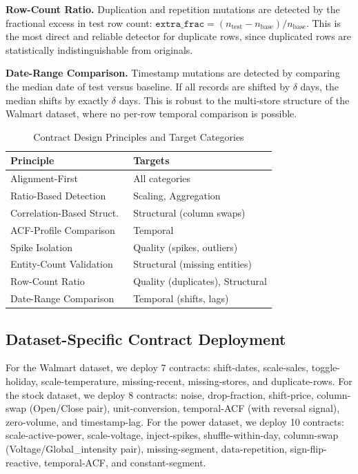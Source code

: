 \documentclass[journal]{IEEEtran}
\begin{document}
\textbf{Row-Count Ratio.}  Duplication and repetition mutations are detected
by the fractional excess in test row count:
$\texttt{extra\_frac} = (n_{\mathrm{test}} - n_{\mathrm{base}}) /
n_{\mathrm{base}}$.  This is the most direct and reliable detector for
duplicate rows, since duplicated rows are statistically indistinguishable
from originals.

\textbf{Date-Range Comparison.}  Timestamp mutations are detected by
comparing the median date of test versus baseline.  If all records are
shifted by $\delta$ days, the median shifts by exactly $\delta$ days.
This is robust to the multi-store structure of the Walmart dataset, where
no per-row temporal comparison is possible.

\begin{table}[!t]
\renewcommand{\arraystretch}{1.15}
\caption{Contract Design Principles and Target Categories}
\label{tab:principles}
\centering
\small
\begin{tabular}{lp{3.8cm}}
\toprule
\textbf{Principle} & \textbf{Targets} \\
\midrule
Alignment-First            & All categories \\
Ratio-Based Detection      & Scaling, Aggregation \\
Correlation-Based Struct.\ & Structural (column swaps) \\
ACF-Profile Comparison     & Temporal \\
Spike Isolation            & Quality (spikes, outliers) \\
Entity-Count Validation    & Structural (missing entities) \\
Row-Count Ratio            & Quality (duplicates), Structural \\
Date-Range Comparison      & Temporal (shifts, lags) \\
\bottomrule
\end{tabular}
\end{table}

\subsection{Dataset-Specific Contract Deployment}

For the Walmart dataset, we deploy 7 contracts: shift-dates, scale-sales,
toggle-holiday, scale-temperature, missing-recent, missing-stores, and
duplicate-rows.  For the stock dataset, we deploy 8 contracts: noise,
drop-fraction, shift-price, column-swap (Open/Close pair), unit-conversion,
temporal-ACF (with reversal signal), zero-volume, and timestamp-lag.  For
the power dataset, we deploy 10 contracts: scale-active-power,
scale-voltage, inject-spikes, shuffle-within-day, column-swap
(Voltage/Global\_intensity pair), missing-segment, data-repetition,
sign-flip-reactive, temporal-ACF, and constant-segment.
\end{document}
